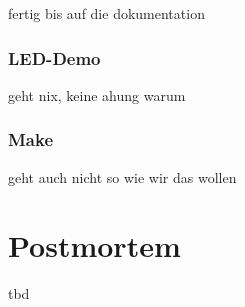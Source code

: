 \begin{DoxyItemize}
\item fertig bis auf die dokumentation 
\end{DoxyItemize}\hypertarget{md_lerntagebuch_autotoc_md14}{}\subsubsection{L\+E\+D-\/\+Demo}\label{md_lerntagebuch_autotoc_md14}

\begin{DoxyItemize}
\item geht nix, keine ahung warum 
\end{DoxyItemize}\hypertarget{md_lerntagebuch_autotoc_md15}{}\subsubsection{Make}\label{md_lerntagebuch_autotoc_md15}

\begin{DoxyItemize}
\item geht auch nicht so wie wir das wollen
\end{DoxyItemize}\hypertarget{md_lerntagebuch_autotoc_md16}{}\section{Postmortem}\label{md_lerntagebuch_autotoc_md16}
tbd 